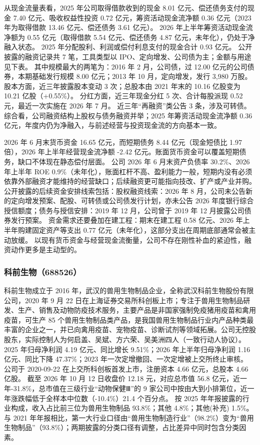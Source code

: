  从现金流量表看，2025 年公司取得借款收到的现金 8.01 亿元、偿还债务支付的现金 7.40 亿元、吸收权益性投资 0.72 亿元，筹资活动现金流净额 0.36 亿元（2023 年为取得借款 13.46 亿元、偿还债务 3.61 亿元）。 2026 年上半年筹资活动现金流净额为 0.55 亿元（取得借款 5.54 亿元、偿还债务 4.87 亿元，未年化），仍处于净融入状态。 2025 年分配股利、利润或偿付利息支付的现金合计 0.93 亿元。 公开披露的融资记录共 7 笔，工具类型以 IPO、定向增发、公司债为主；金额与用途见下表。 其中规模最大的两笔为：2016 年 2 月，公司债，过 12.00 亿元的公司债券，本期基础发行规模 8.00 亿元；2013 年 10 月，定向增发，发行 3,980 万股。 股本方面，近三年披露股本变动 3 次；总股本由 2021 年末的 10.16 亿股变为 10.21 亿股（+0.55\%）。 分红方面，近三年现金分红 5 次、合计每股派现 0.52 元，最近一次实施在 2026 年 7 月。 近三年“再融资”类公告 3 条，涉及可转债。 综合看，公司融资结构上股权与债务融资并举；2025 年筹资活动现金流净额 0.36 亿元，年度内仍为净融入，与前述经营与投资现金流的方向基本一致。

 2026 年 6 月末货币资金 16.65 亿元，而短期债务 8.44 亿元（现金短债比 1.97 倍），2026 年上半年经营现金流净额 -2.42 亿元。账面货币资金可以覆盖短期债务，缺口不体现在静态偿付层面。 公司 2026 年 6 月末资产负债率 30.2\%、2026 年上半年 ROE 0.9\%（未年化），账面杠杆不高、盈利能力一般，短期内没有必须依靠外部融资才能维持的经营缺口；后续融资更可能指向技改、扩产或产业并购。 公开披露的后续资金安排线索包括：股权融资线索：2026 年 8 月，公司未公告新的定向增发预案、配股、可转债或公司债发行计划，亦未公告 2026 年度银行综合授信额度；债务与授信安排：2019 年 12 月，公司曾于 2019 年 12 月披露公司债券发行预案。 资金需求还要叠加在建工程：期末在建工程 0.58 亿元、2026 年上半年购建固定资产等支出 0.77 亿元（未年化），这部分支出在周期底部通常会被主动放缓。 以现有货币资金与经营现金流衡量，公司不存在刚性补血的紧迫性，融资动作更多是主动型的。




\subsubsection{科前生物（688526）}
\label{co:688526}

 科前生物成立于 2016 年，武汉的兽用生物制品企业，全称武汉科前生物股份有限公司，2020 年 9 月 22 日在上海证券交易所科创板上市；专注于兽用生物制品研发、生产、销售及动物防疫技术服务，主要产品是非国家强制免疫猪用疫苗和禽用疫苗，可生产 85 个兽用生物制品类产品，是我国兽用生物制品行业内产品种类最丰富的企业之一，并已向禽用疫苗、宠物疫苗、诊断试剂等领域拓展。公司无控股股东，实际控制人为何启盖、吴斌、方六荣、吴美洲四人（一致行动人协议）。2025 年归母净利润 4.19 亿元、同比增长 9.51\%；2026 年上半年归母净利润 1.16 亿元、同比下降 47.37\%；2023 年一次定增撤回、一次定增被上交所终止审核。 公司于 2020-09-22 在上交所科创板首发上市，注册资本 4.66 亿元，总股本 4.66 亿股。 截至 2026 年 10 月 12 日收盘价 12.18 元，对应总市值 56.8 亿元，近一年-31.8\%，总市值在三级行业“动物保健Ⅲ”的 9 家公司中按由大到小排第位，近一年涨跌幅低于全样本中位数（-10.4\%）21.4 个百分点。 按 2025 年年报披露的行业构成，收入占比前三位为兽用生物制品 93.8\%；其他 4.8\%；其他(补充) 1.5\%。 与 2021 年年报相比，第一大行业口径由“兽用生物制造行业”（98.2\%）变为“兽用生物制品”（93.8\%）；两期披露的分类口径有调整，占比差异中同时包含分类因素。

